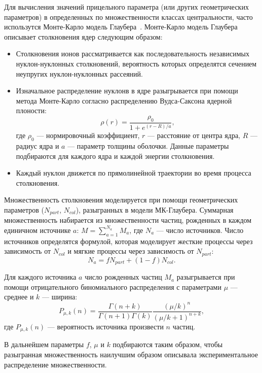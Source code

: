 Для вычисления значений прицельного параметра (или других геометрических параметров) в определенных по множественности классах центральности, часто использутся Монте-Карло модель Глаубера~\cite{Miller:2007ri}.
Монте-Карло модель Глаубера описывает столкновения ядер следующим образом:
\begin{itemize}
    \item Столкновения ионов рассматривается как последовательность независимых нуклон-нуклонных столкновений, вероятность которых определятся сечением неупругих нуклон-нуклонных рассеяний.
    \item Изначальное распределение нуклонв в ядре разыгрывается при помощи метода Монте-Карло согласно распределению Вудса-Саксона ядерной плоности:
    \begin{equation}
        \rho(r) = \frac{ \rho_0 }{ 1 + e^{ (r-R)/a } },
        \label{eq:woods_saxon}
    \end{equation}
    где $\rho_0$ --- нормировочный коэффициент, $r$ --- расстояние от центра ядра, $R$ --- радиус ядра и $a$ --- параметр толщины оболочки.
    Данные параметры подбираются для каждого ядра и каждой энергии столкновения.
    \item Каждый нуклон движется по прямолинейной траектории во время процесса столкновения.
\end{itemize}

Множественность столкновения моделируется при помощи геометрических параметров ($N_{part}$, $N_{col}$), разыгранных в модели МК-Глаубера.
Суммарная множественность набирается из множественности частиц, рожденных в каждом единичном источнике $a$: $M=\sum_{a=1}^{N_a} M_a$, где $N_a$ --- число источников.
Число источников определятся формулой, которая моделирует жесткие процессы через зависимость от $N_{col}$ и мягкие процессы через зависимость от $N_{part}$:
\begin{equation}
    N_a = f N_{part} + (1-f) N_{col}.
\end{equation}

Для каждого источника $a$ число рожденных частиц $M_a$ разыгрывается при помощи отрицательного биномиального распределения с параметрами $\mu$ --- среднее и $k$ --- ширина:
\begin{equation}
    P_{\mu,k}(n) = \frac{ \Gamma (n+k) }{ \Gamma(n+1) \Gamma(k) } \frac{ (\mu/k)^n }{ (\mu/k+1)^{n+k} },
\end{equation}
где $P_{\mu,k}(n)$ --- вероятность источника произвести $n$ частиц.

В дальнейшем параметры $f$, $\mu$ и $k$ подбираются таким образом, чтобы разыгранная множественность наилучшим образом описывала экспериментальное распределение множественности.

